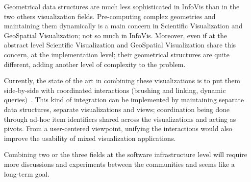 Geometrical data structures are much less sophisticated in InfoVis
than in the two others visualization fields.  Pre-computing complex
geometries and maintaining them dynamically is a main concern in
Scientific Visualization and GeoSpatial Visualization; not so much in
InfoVis.  Moreover, even if at the abstract level Scientific
Visualization and GeoSpatial Visualization share this concern, at the
implementation level; their geometrical structures are quite
different, adding another level of complexity to the problem.

Currently, the state of the art in combining these visualizations is
to put them side-by-side with coordinated interactions (brushing and
linking, dynamic queries)~\cite{Coord3D}.  This kind of integration 
can be implemented by maintaining separate data structures, separate
visualizations and views; coordination being done through ad-hoc item
identifiers shared across the visualizations and acting as pivots.
From a user-centered viewpoint, unifying the interactions would also
improve the usability of mixed visualization applications.

Combining two or the three fields at the software infrastructure
level will require more discussions and experiments between the
communities and seems like a long-term goal.

